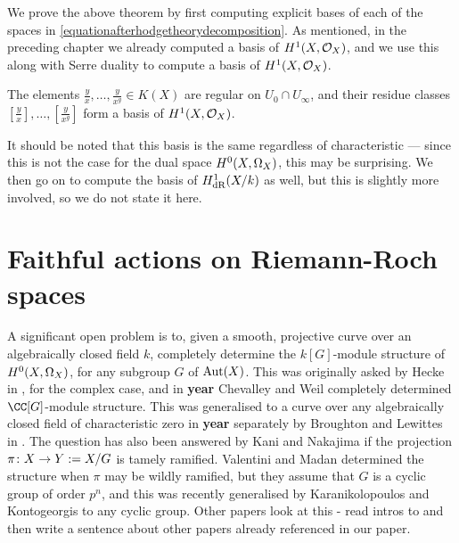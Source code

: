 We prove the above theorem by first computing explicit bases of each of the spaces in \eqref{equationafterhodgetheorydecomposition}.
As mentioned, in the preceding chapter we already computed a basis of $H^1(X,\mathcal{O}_X)$, and we use this along with Serre duality to compute a basis of $H^1(X,\mathcal{O}_X)$.
    \begin{thm}
    The elements $\frac{y}{x}, \ldots, \frac{y}{x^g} \in K(X)$ are regular on $U_0 \cap U_\infty$, and their residue classes $\left [ \frac{y}{x} \right ],  \ldots, \left [ \frac{y}{x^g} \right]$ form a basis of $H^1(X,\mathcal{O}_X)$.
    \end{thm}
 It should be noted that this basis is the same regardless of characteristic --- since this is not the case for the dual space ${H^0(X,\Omega_X)}$, this may be surprising.
 We then go on to compute the basis of $H_{\text {dR}}^1(X/k)$ as well, but this is slightly more involved, so we do not state it here.


 \section{Faithful actions on Riemann-Roch spaces}

 A significant open problem is to, given a smooth, projective curve over an algebraically closed field $k$, completely determine the $k[G]$-module structure of ${H^0(X,\Omega_X)}$, for any subgroup $G$ of $\operatorname{Aut}(X)$.
 This was originally asked by Hecke in , for the complex case, and in \textbf{year} Chevalley and Weil completely determined $\CC[G]$-module structure.
This was generalised to a curve over any algebraically closed field of characteristic zero in \textbf{year} separately by Broughton and Lewittes in .
The question has also been answered by Kani  and Nakajima  if the projection $\pi \colon X \rightarrow Y:= X/G$ is tamely ramified.
Valentini and Madan determined the structure when $\pi$ may be wildly ramified, but they assume that $G$ is a cyclic group of order $p^n$, and this was recently generalised by Karanikolopoulos and Kontogeorgis to any cyclic group.
Other papers look at this - read intros to and then write a sentence about other papers already referenced in our paper.

